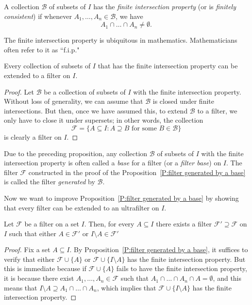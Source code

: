 \documentclass{scrartcl}
\begin{document}
\begin{definition}
\label{D:fip}
A collection $\mathscr{B}$ of subsets of $I$ has the \emph{finite intersection property} (or is \emph{finitely consistent}) if whenever $A_1,\dots, A_n\in\mathscr{B}$, we have \[A_1\cap\dots\cap A_n\neq \emptyset \text{.}
\]
\end{definition}


The finite intersection property is ubiquitous in mathematics. Mathematicians often refer to it as ``f.i.p."

\begin{proposition}
\label{P:filter generated by a base}
Every collection of subsets of $I$ that has the finite intersection property can be extended to a filter on $I$.
\end{proposition}

\begin{proof}
Let $\mathscr{B}$ be a collection of subsets of $I$ with the finite intersection property. Without loss of generality, we can assume that $\mathscr{B}$ is closed under finite intersections. But then, once we have assumed this, to extend $\mathscr{B}$ to a filter, we only have to close it under supersets; in other words, the collection
\[
\mathscr{F}=\{A\subseteq I \colon A\supseteq B 
\text{ for some $B\in \mathscr{B}$} \}
\]
is clearly a filter on $I$.
\end{proof}

Due to the preceding proposition, any collection $\mathscr{B}$ of subsets of $I$ with the finite intersection property is often called a \emph{base} for a filter (or a \emph{filter base}) on $I$. The filter $\mathscr{F}$ constructed in the proof of the Proposition~\ref{P:filter generated by a base} is called the filter \emph{generated} by $\mathscr{B}$.

Now we want to improve Proposition~\ref{P:filter generated by a base} by showing that every filter can be extended to an ultrafilter on $I$.

\begin{proposition}
\label{P:ultrafilter lemma}
Let $\mathscr{F}$ be a filter on a set $I$. Then,  for every $A\subseteq I$ there exists a filter $\mathscr{F}'\supseteq \mathscr{F}$ on $I$ such that either $A\in \mathscr{F}'$ or $I\setminus A \in \mathscr{F}'$
\end{proposition}

\begin{proof}
Fix a set $A\subseteq I$. By Proposition~\ref{P:filter generated by a base}, it suffices to verify that either $\mathscr{F}\cup\{A\}$ or $\mathscr{F}\cup\{I\setminus A\}$ has the finite intersection property. But this is immediate because if $\mathscr{F}\cup\{A\}$ fails to have the finite intersection property, it is because there exist $A_1,\dots, A_n\in \mathscr{F}$ such that
$A_1 \cap\dots \cap A_n\cap A=\emptyset$, and this means that 
$I\setminus A\supseteq A_1 \cap\dots \cap A_n$,
which implies that $\mathscr{F}\cup\{I\setminus A\}$ has the finite intersection property.
\end{proof}
\end{document}
